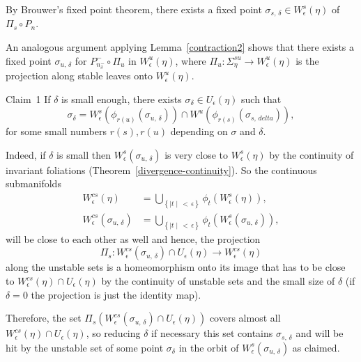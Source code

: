 \documentclass[AHL,Unicode,longabstracts,published]{cedram}
\begin{document}
By Brouwer's fixed point theorem, there exists a fixed point $\sigma_{s,\,\delta} \in W^{s}_{\epsilon}(\eta)$ of $\Pi_{s} \circ P_{n}$.

An analogous argument applying Lemma~\ref{contraction2} shows that there exists a fixed point $\sigma_{u,\,\delta}$ for $P_{n_{\delta}^{-}}^{-}\circ \Pi_{u}$ in $W^{u}_{\epsilon}(\eta)$, where $\Pi_{u} : \Sigma_{\eta}^{su} \longrightarrow W^{u}_{\epsilon}(\eta)$ is the projection along stable leaves onto $W^{u}_{\epsilon}(\eta)$.

\begin{enonce*}[plain]{Claim~1} If $\delta$ is small enough, there exists $\sigma_{\delta} \in U_{\epsilon}(\eta)$ such that
\[
\sigma_{\delta} = W^{s}_{\epsilon}\left(\phi_{r(u)}(\sigma_{u, \,\delta})\right)\cap W^{u}\left(\phi_{r(s)}(\sigma_{s,\,delta})\right),
\]
for some small numbers $r(s), r(u)$ depending on $\sigma$ and $\delta$.
\end{enonce*}

Indeed, if $\delta $ is small then $W^{s}_{\epsilon}(\sigma_{u, \,\delta})$ is very close to $W^{s}_{\epsilon}(\eta)$ by the continuity of invariant foliations (Theorem~\ref{divergence-continuity}). So the continuous submanifolds
\begin{align*}
W^{cs}_{\epsilon}(\eta) &= \bigcup_{\left\{\mid t \mid\,<\,\epsilon\right\}} \phi_{t}\left(W^{s}_{\epsilon}(\eta)\right),
\\
W^{cs}_{\epsilon}(\sigma_{u,\,\delta}) &= \bigcup_{\left\{\mid t \mid\,<\,\epsilon\right\}} \phi_{t}\left(W^{s}_{\epsilon}(\sigma_{u,\,\delta})\right),
\end{align*}
will be close to each other as well and hence, the projection
\[
\Pi_{s} : W^{cs}_{\epsilon}(\sigma_{u,\,\delta}) \cap U_{\epsilon}(\eta) \longrightarrow W^{cs}_{\epsilon}(\eta)
\]
along the unstable sets is a homeomorphism onto its image that has to be close to $W^{cs}_{\epsilon}(\eta) \cap U_{\epsilon}(\eta)$ by the continuity of unstable sets and the small size of $\delta$ (if $\delta =0$ the projection is just the identity map).

Therefore, the set $\Pi_{s}(W^{cs}_{\epsilon}(\sigma_{u,\,\delta})\cap U_{\epsilon}(\eta)) $ covers almost all $W^{cs}_{\epsilon}(\eta) \cap U_{\epsilon}(\eta) $, so reducing $\delta$ if necessary this set contains $\sigma_{s,\,\delta}$ and will be hit by the unstable set of some point $\sigma_{\delta}$ in the orbit of $W^{s}_{\epsilon}(\sigma_{u,\,\delta})$ as claimed.
\end{document}
